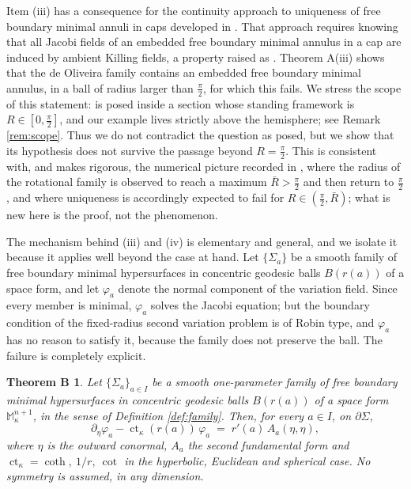 \documentclass[10pt,a4paper]{amsart}
\newtheorem*{thmB}{Theorem B}
\newcommand{\M}{\mathbb{M}}
\newcommand{\ct}{\operatorname{ct}_\kappa}
\begin{document}
Item (iii) has a consequence for the continuity approach to uniqueness of free boundary minimal annuli in caps developed in \cite[\S 6]{NZ1}. That approach requires knowing that all Jacobi fields of an embedded free boundary minimal annulus in a cap are induced by ambient Killing fields, a property raised as \cite[Question 6.6]{NZ1}. Theorem A(iii) shows that the de Oliveira family contains an embedded free boundary minimal annulus, in a ball of radius larger than $\tfrac\pi2$, for which this fails. We stress the scope of this statement: \cite[Question 6.6]{NZ1} is posed inside a section whose standing framework is $R\in[0,\tfrac\pi2]$, and our example lives strictly above the hemisphere; see Remark \ref{rem:scope}. Thus we do not contradict the question as posed, but we show that its hypothesis does not survive the passage beyond $R=\tfrac\pi2$. This is consistent with, and makes rigorous, the numerical picture recorded in \cite[Rem. 1.3]{NZ1}, where the radius of the rotational family is observed to reach a maximum $\bar R>\tfrac\pi2$ and then return to $\tfrac\pi2$, and where uniqueness is accordingly expected to fail for $R\in(\tfrac\pi2,\bar R)$; what is new here is the proof, not the phenomenon.

The mechanism behind (iii) and (iv) is elementary and general, and we isolate it because it applies well beyond the case at hand. Let $\{\Sigma_a\}$ be a smooth family of free boundary minimal hypersurfaces in concentric geodesic balls $B(r(a))$ of a space form, and let $\varphi_a$ denote the normal component of the variation field. Since every member is minimal, $\varphi_a$ solves the Jacobi equation; but the boundary condition of the fixed-radius second variation problem is of Robin type, and $\varphi_a$ has no reason to satisfy it, because the family does not preserve the ball. The failure is completely explicit.

\begin{thmB}
Let $\{\Sigma_a\}_{a\in I}$ be a smooth one-parameter family of free boundary minimal hypersurfaces in concentric geodesic balls $B(r(a))$ of a space form $\M^{n+1}_\kappa$, in the sense of Definition \textup{\ref{def:family}}. Then, for every $a\in I$, on $\partial\Sigma$,
\[
\partial_\eta\varphi_a-\ct(r(a))\,\varphi_a\;=\;r'(a)\,A_a(\eta,\eta),
\]
where $\eta$ is the outward conormal, $A_a$ the second fundamental form and $\ct=\coth,\ 1/r,\ \cot$ in the hyperbolic, Euclidean and spherical case. No symmetry is assumed, in any dimension.
\end{thmB}
\end{document}

